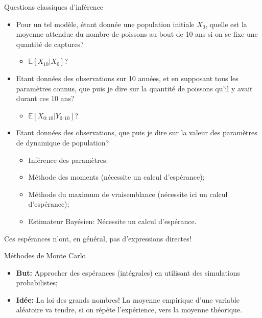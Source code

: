 \documentclass[ignorenonframetext,]{beamer}
\providecommand{\tightlist}{%
  \setlength{\itemsep}{0pt}\setlength{\parskip}{0pt}}
\begin{document}
\begin{frame}{Questions classiques d'inférence}
\protect\hypertarget{questions-classiques-dinfuxe9rence}{}

\pause

\begin{itemize}
\tightlist
\item
  Pour un tel modèle, étant donnée une population initiale \(X_0\),
  quelle est la moyenne attendue du nombre de poissons au bout de 10 ans
  si on se fixe une quantité de captures?\pause

  \begin{itemize}
  \tightlist
  \item
    \(\mathbb{E}\left[X_{10} \vert X_0 \right]\)?\pause
  \end{itemize}
\item
  Etant données des observations sur 10 années, et en supposant tous les
  paramètres connus, que puis je dire sur la quantité de poissons qu'il
  y avait durant ces 10 ans? \pause

  \begin{itemize}
  \tightlist
  \item
    \(\mathbb{E}\left[X_{0:10} \vert Y_{0:10} \right]\)? \pause
  \end{itemize}
\item
  Etant données des observations, que puis je dire sur la valeur des
  paramètres de dynamique de population?\pause

  \begin{itemize}
  \tightlist
  \item
    Inférence des paramètres:
  \item
    Méthode des moments (nécessite un calcul d'espérance);\pause
  \item
    Méthode du maximum de vraisemblance (nécessite ici un calcul
    d'espérance);\pause
  \item
    Estimateur Bayésien: Nécessite un calcul d'espérance. \pause
  \end{itemize}
\end{itemize}

Ces espérances n'ont, en général, pas d'expressions directes!

\end{frame}

\begin{frame}{Méthodes de Monte Carlo}
\protect\hypertarget{muxe9thodes-de-monte-carlo}{}

\pause

\begin{itemize}
\tightlist
\item
  \textbf{But:} Approcher des espérances (intégrales) en utilisant des
  simulations probabilistes; \pause
\item
  \textbf{Idée:} La loi des grands nombres! La moyenne empirique d'une
  variable aléatoire va tendre, si on répète l'expérience, vers la
  moyenne théorique.
\end{itemize}

\end{frame}
\end{document}
